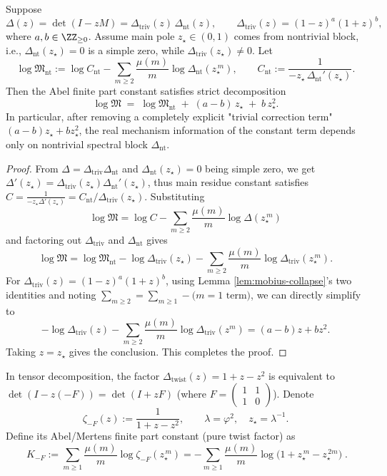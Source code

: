 \begin{proposition}\label{prop:real-input-40-reduced-mertens}
Suppose
\[
\Delta(z)=\det(I-zM)=\Delta_{\mathrm{triv}}(z)\,\Delta_{\mathrm{nt}}(z),
\qquad
\Delta_{\mathrm{triv}}(z)=(1-z)^a(1+z)^b,
\]
where $a,b\in\ZZ_{\ge 0}$. Assume main pole $z_\star\in(0,1)$ comes from nontrivial block, i.e., $\Delta_{\mathrm{nt}}(z_\star)=0$ is a simple zero, while $\Delta_{\mathrm{triv}}(z_\star)\neq 0$.
Let
\[
\log\mathfrak{M}_{\mathrm{nt}}
:=\log C_{\mathrm{nt}}-\sum_{m\ge 2}\frac{\mu(m)}{m}\log \Delta_{\mathrm{nt}}(z_\star^{\,m}),
\qquad
C_{\mathrm{nt}}:=\frac{1}{-z_\star\,\Delta_{\mathrm{nt}}'(z_\star)}.
\]
Then the Abel finite part constant satisfies strict decomposition
\[
\boxed{\;
\log\mathfrak{M}
\;=\;
\log\mathfrak{M}_{\mathrm{nt}}
\;+\;
(a-b)\,z_\star
\;+\;
b\,z_\star^2.
\;}
\]
In particular, after removing a completely explicit "trivial correction term"\((a-b)z_\star+bz_\star^2\), the real mechanism information of the constant term depends only on nontrivial spectral block $\Delta_{\mathrm{nt}}$.
\end{proposition}
\begin{proof}
From $\Delta=\Delta_{\mathrm{triv}}\Delta_{\mathrm{nt}}$ and $\Delta_{\mathrm{nt}}(z_\star)=0$ being simple zero, we get
\(
\Delta'(z_\star)=\Delta_{\mathrm{triv}}(z_\star)\Delta_{\mathrm{nt}}'(z_\star)
\),
thus main residue constant satisfies
\(
C=\frac{1}{-z_\star\Delta'(z_\star)}=C_{\mathrm{nt}}/\Delta_{\mathrm{triv}}(z_\star)
\).
Substituting
\[
\log\mathfrak{M}=\log C-\sum_{m\ge 2}\frac{\mu(m)}{m}\log\Delta(z_\star^{\,m})
\]
and factoring out $\Delta_{\mathrm{triv}}$ and $\Delta_{\mathrm{nt}}$ gives
\[
\log\mathfrak{M}
=\log\mathfrak{M}_{\mathrm{nt}}
-\log\Delta_{\mathrm{triv}}(z_\star)
-\sum_{m\ge 2}\frac{\mu(m)}{m}\log\Delta_{\mathrm{triv}}(z_\star^{\,m}).
\]
For $\Delta_{\mathrm{triv}}(z)=(1-z)^a(1+z)^b$, using Lemma \ref{lem:mobius-collapse}'s two identities and noting
\(
\sum_{m\ge 2}=\sum_{m\ge 1}-\text{(}m=1\text{ term)}
\),
we can directly simplify to
\[
-\log\Delta_{\mathrm{triv}}(z)-\sum_{m\ge 2}\frac{\mu(m)}{m}\log\Delta_{\mathrm{triv}}(z^{m})
=(a-b)z+bz^2.
\]
Taking $z=z_\star$ gives the conclusion. This completes the proof.
\end{proof}
\begin{definition}\label{def:real-input-40-artin-sign-mertens}
In tensor decomposition, the factor
\(
\Delta_{\mathrm{twist}}(z)=1+z-z^2
\)
is equivalent to
\(
\det(I-z(-F))=\det(I+zF)
\)
(where \(F=\begin{pmatrix}1&1\\1&0\end{pmatrix}\)).
Denote
\[
\zeta_{-F}(z):=\frac{1}{1+z-z^2},
\qquad
\lambda=\varphi^2,\quad z_\star=\lambda^{-1}.
\]
Define its Abel/Mertens finite part constant (pure twist factor) as
\[
\boxed{\;
K_{-F}
:=\sum_{m\ge 1}\frac{\mu(m)}{m}\log\zeta_{-F}(z_\star^{\,m})
=-\sum_{m\ge 1}\frac{\mu(m)}{m}\log\!\bigl(1+z_\star^{\,m}-z_\star^{\,2m}\bigr)\; }.
\]
\end{definition}
